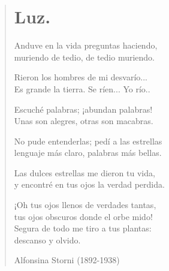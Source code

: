 \documentclass[12pt, twoside]{book}
\begin{document}
\begin{verse}
\begin{center}
\section{Luz.}
\end{center}
Anduve en la vida preguntas haciendo,\\
muriendo de tedio, de tedio muriendo.\newline

Rieron los hombres de mi desvarío...\\
Es grande la tierra. Se ríen... Yo río..\newline

Escuché palabras; ¡abundan palabras!\\
Unas son alegres, otras son macabras.\newline

No pude entenderlas; pedí a las estrellas\\
lenguaje más claro, palabras más bellas.\newline

Las dulces estrellas me dieron tu vida,\\
y encontré en tus ojos la verdad perdida.\newline

¡Oh tus ojos llenos de verdades tantas,\\
tus ojos obscuros donde el orbe mido!\\
Segura de todo me tiro a tus plantas:\\
descanso y olvido. \newline

Alfonsina Storni (1892-1938)
\end{verse}
\newpage
\end{document}
